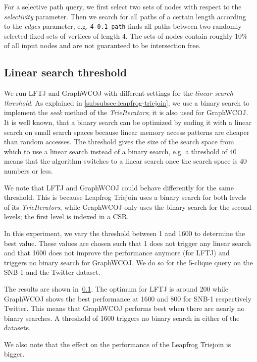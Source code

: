 For a selective path query, we first select two sets of nodes with respect to the \textit{selectivity} parameter.
Then we search for all paths of a certain length according to the \textit{edges} parameter, e.g. \texttt{4-0.1-path} finds all
paths between two randomly selected fixed sets of vertices of length 4.
The sets of nodes contain roughly 10\% of all input nodes and are
not guaranteed to be intersection free.

\subsection{Linear search threshold}\label{subsec:linear-search-threshold}

We run \textsc{LFTJ} and GraphWCOJ with different settings for the \textit{linear search threshold}.
As explained in \cref{subsubsec:leapfrog-triejoin}, we use a binary search to implement the \textit{seek}
method of the \textit{TrieIterators};
it is also used for GraphWCOJ.
It is well known, that a binary search can be optimized by ending it with a linear search on small
search spaces because linear memory access patterns are cheaper than random accesses.
The threshold gives the size of the search space from which to use a linear search instead of
a binary search, e.g. a threshold of 40 means that the algorithm switches to a linear search
once the search space is 40 numbers or less.

We note that \textsc{LFTJ} and GraphWCOJ could behave differently for the same threshold.
This is because Leapfrog Triejoin uses a binary search for both levels of its \textit{TrieIterators},
while GraphWCOJ only uses the binary search for the second levels;
the first level is indexed in a \textsc{CSR}.

In this experiment, we vary the threshold between 1 and 1600 to determine the best value.
These values are chosen such that 1 does not trigger any linear search and that 1600
does not improve the performance anymore (for \textsc{LFTJ}) and triggers no
binary search for GraphWCOJ.
We do so for the 5-clique query on the SNB-1 and the Twitter dataset.

The results are shown in~\cref{subsec:linear-search-threshold}.
The optimum for LFTJ is around 200 while GraphWCOJ shows the best performance at 1600 and 800 for
SNB-1 respectively Twitter.
This means that GraphWCOJ performs best when there are nearly no binary searches.
A threshold of 1600 triggers no binary search in either of the datasets.

We also note that the effect on the performance of the Leapfrog Triejoin is bigger.

